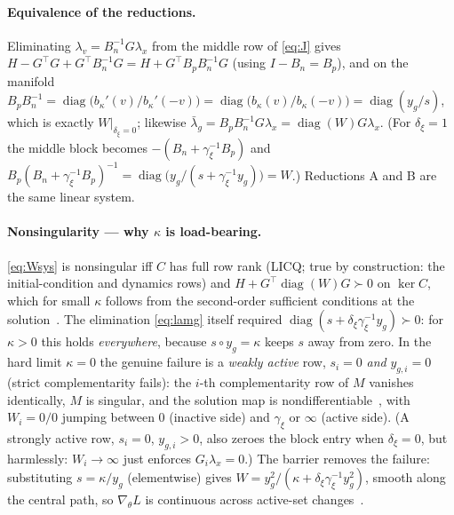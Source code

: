 \documentclass[10pt,twocolumn]{article}
\newcommand{\diag}{\operatorname{diag}}
\begin{document}
\paragraph{Equivalence of the reductions.} Eliminating
$\lambda_v = B_n^{-1}G\lambda_x$ from the middle row of \eqref{eq:J} gives
$H - G^\top G + G^\top B_n^{-1}G = H + G^\top B_pB_n^{-1}G$ (using $I - B_n = B_p$),
and on the manifold
$B_pB_n^{-1} = \diag\bigl(b_\kappa'(v)/b_\kappa'(-v)\bigr)
= \diag\bigl(b_\kappa(v)/b_\kappa(-v)\bigr) = \diag(y_g/s)$,
which is exactly $W|_{\delta_\xi=0}$; likewise
$\bar\lambda_g = B_pB_n^{-1}G\lambda_x = \diag(W)G\lambda_x$. (For $\delta_\xi = 1$
the middle block becomes $-(B_n + \gamma_\xi^{-1}B_p)$ and
$B_p(B_n+\gamma_\xi^{-1}B_p)^{-1}
= \diag\bigl(y_g/(s+\gamma_\xi^{-1}y_g)\bigr) = W$.)
Reductions A and B are the same linear system.

\paragraph{Nonsingularity --- why $\kappa$ is load-bearing.}
\eqref{eq:Wsys} is nonsingular iff $C$ has full row rank (LICQ; true by
construction: the initial-condition and dynamics rows) and
$H + G^\top\diag(W)G \succ 0$ on $\ker C$, which for small $\kappa$ follows from
the second-order sufficient conditions at the solution~\cite[Ass.~1, Thm.~1]{frey}.
The elimination \eqref{eq:lamg} itself required
$\diag(s + \delta_\xi\gamma_\xi^{-1}y_g)\succ 0$: for $\kappa>0$ this holds
\emph{everywhere}, because $s\circ y_g = \kappa$ keeps $s$ away from zero. In the
hard limit $\kappa=0$ the genuine failure is a \emph{weakly active} row,
$s_i = 0$ \emph{and} $y_{g,i} = 0$ (strict complementarity fails): the $i$-th
complementarity row of $M$ vanishes identically, $M$ is singular, and the solution
map is nondifferentiable~\cite{optnet,frey}, with $W_i = 0/0$ jumping between $0$
(inactive side) and $\gamma_\xi$ or $\infty$ (active side). (A strongly active row,
$s_i = 0$, $y_{g,i} > 0$, also zeroes the block entry when $\delta_\xi = 0$, but
harmlessly: $W_i\to\infty$ just enforces $G_i\lambda_x = 0$.) The barrier removes
the failure: substituting $s = \kappa/y_g$ (elementwise) gives
$W = y_g^2/(\kappa + \delta_\xi\gamma_\xi^{-1}y_g^2)$, smooth along the central
path, so $\nabla_\theta L$ is continuous across active-set changes~\cite{tracy}.
\end{document}
